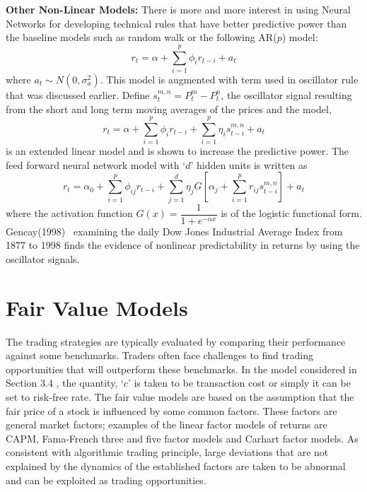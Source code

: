 \noindent \textbf{Other Non-Linear Models:} There is more and more interest in using Neural Networks for developing technical rules that have better predictive power than the baseline models such as random walk or the following AR($p$) model:
	\begin{equation}\label{eqn:ri}
	r_t = \alpha + \sum_{i=1}^p\phi_ir_{t-i} + a_t 
	\end{equation}
where $a_t \sim N(0, \sigma_a^2)$. This model is augmented with term used in oscillator rule that was discussed earlier. Define $s_t^{m,n} = P_t^m - P_t^n$, the oscillator signal resulting from the short and long term moving averages of the prices and the model,
	\begin{equation}\label{eqn:rtsum}
	r_t = \alpha + \sum_{i=1}^p\phi_ir_{t-i} + \sum_{i=1}^p\eta_is_{t-i}^{m,n}+ a_t
	\end{equation}
is an extended linear model and is shown to increase the predictive power. The feed forward neural network model with `$d$' hidden units is written as
	\begin{equation}\label{eqn:rtsum2}
	r_t = \alpha_0 + \sum_{i=1}^p \phi_{ij}r_{t-i} + \sum_{j=1}^d \eta_j G\left[\alpha_j + \sum_{i=1}^pr_{ij}s_{t-i}^{m,n} \right] + a_t
	\end{equation}
where the activation function $G(x) = \dfrac{1}{1 + e^{-\alpha x}}$ is of the logistic functional form. Gencay(1998)~\cite{gencay} examining the daily Dow Jones Industrial Average Index from 1877 to 1998 finds the evidence of nonlinear predictability in returns by using the oscillator signals.


\section{Fair Value Models}


The trading strategies are typically evaluated by comparing their performance against some benchmarks. Traders often face challenges to find trading opportunities that will outperform these benchmarks. In the model considered in Section 3.4 , the quantity, `$c$' is taken to be transaction cost or simply it can be set to risk-free rate. The fair value models are based on the assumption that the fair price of a stock is influenced by some common factors. These factors are general market factors; examples of the linear factor models of returns are CAPM, Fama-French three and five factor models and Carhart factor models. As consistent with algorithmic trading principle, large deviations that are not explained by the dynamics of the established factors are taken to be abnormal and can be exploited as trading opportunities.


